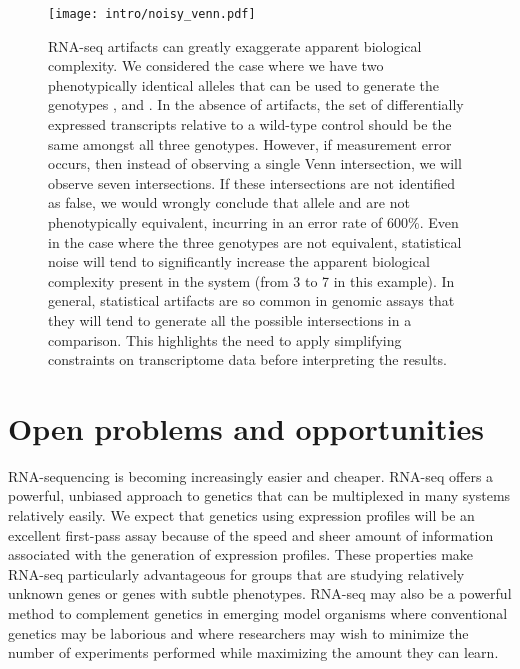 \begin{figure}
  \centering
  \texttt{[image: intro/noisy\_venn.pdf]}
  \caption{RNA-seq artifacts can greatly exaggerate apparent biological
  complexity. We considered the case where we have two phenotypically identical
  alleles that can be used to generate the genotypes ,
   and . In the absence of artifacts, the set of
  differentially expressed transcripts relative to a wild-type control should be
  the same amongst all three genotypes. However, if measurement error occurs,
  then instead of observing a single Venn intersection, we will observe seven
  intersections. If these intersections are not identified as false, we would
  wrongly conclude that allele  and  are not phenotypically
  equivalent, incurring in an error rate of 600\%. Even in the case where
  the three genotypes are not equivalent, statistical noise will tend to
  significantly increase the apparent biological complexity present in the
  system (from 3 to 7 in this example). In general, statistical artifacts are so
  common in genomic assays that they will tend to generate all the possible
  intersections in a comparison. This highlights the need to apply simplifying
  constraints on transcriptome data before interpreting the
  results.}\label{fig:noisy_venn}
\end{figure}


\section*{Open problems and opportunities}
RNA-sequencing is becoming increasingly easier and cheaper. RNA-seq offers a
powerful, unbiased approach to genetics that can be multiplexed in many systems
relatively easily. We expect that genetics using expression profiles will be an
excellent first-pass assay because of the speed and sheer amount of information
associated with the generation of expression profiles. These properties make
RNA-seq particularly advantageous for groups that are studying relatively
unknown genes or genes with subtle phenotypes. RNA-seq may also be a powerful
method to complement genetics in emerging model organisms where conventional
genetics may be laborious and where researchers may wish to minimize the number
of experiments performed while maximizing the amount they can learn.

